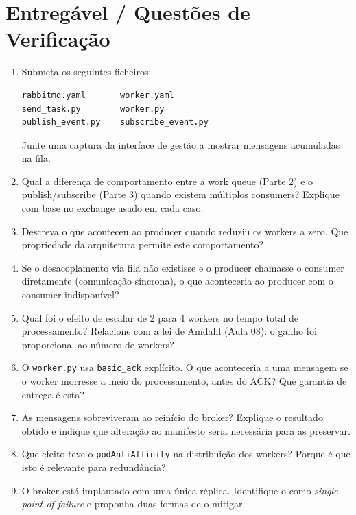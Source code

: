 \documentclass[11pt,a4paper]{article}
\begin{document}
\section{Entregável / Questões de Verificação}
\begin{enumerate}[label=\alph*)]
  \setlength\itemsep{0.2cm}
  \item Submeta os seguintes ficheiros:
\begin{lstlisting}
rabbitmq.yaml       worker.yaml
send_task.py        worker.py
publish_event.py    subscribe_event.py
\end{lstlisting}
  Junte uma captura da interface de gestão a mostrar mensagens acumuladas na fila.
  \item Qual a diferença de comportamento entre a work queue (Parte 2) e o publish/subscribe (Parte 3) quando existem múltiplos consumers? Explique com base no exchange usado em cada caso.
  \item Descreva o que aconteceu ao producer quando reduziu os workers a zero. Que propriedade da arquitetura permite este comportamento?
  \item Se o desacoplamento via fila não existisse e o producer chamasse o consumer diretamente (comunicação síncrona), o que aconteceria ao producer com o consumer indisponível?
  \item Qual foi o efeito de escalar de 2 para 4 workers no tempo total de processamento? Relacione com a lei de Amdahl (Aula 08): o ganho foi proporcional ao número de workers?
  \item O \texttt{worker.py} usa \texttt{basic\_ack} explícito. O que aconteceria a uma mensagem se o worker morresse a meio do processamento, antes do ACK? Que garantia de entrega é esta?
  \item As mensagens sobreviveram ao reinício do broker? Explique o resultado obtido e indique que alteração ao manifesto seria necessária para as preservar.
  \item Que efeito teve o \texttt{podAntiAffinity} na distribuição dos workers? Porque é que isto é relevante para redundância?
  \item O broker está implantado com uma única réplica. Identifique-o como \emph{single point of failure} e proponha duas formas de o mitigar.
\end{enumerate}
\end{document}
